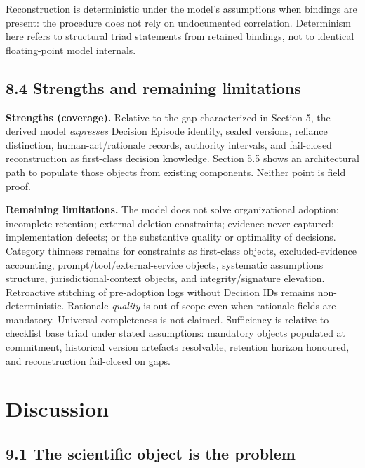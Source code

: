 \documentclass[11pt,a4paper]{article}
\begin{document}
Reconstruction is deterministic under the model's assumptions when bindings are present: the procedure does not rely on undocumented correlation. Determinism here refers to structural triad statements from retained bindings, not to identical floating-point model internals.


\subsection{8.4 Strengths and remaining limitations}

\textbf{Strengths (coverage).} Relative to the gap characterized in Section 5, the derived model \emph{expresses} Decision Episode identity, sealed versions, reliance distinction, human-act/rationale records, authority intervals, and fail-closed reconstruction as first-class decision knowledge. Section 5.5 shows an architectural path to populate those objects from existing components. Neither point is field proof.


\textbf{Remaining limitations.} The model does not solve organizational adoption; incomplete retention; external deletion constraints; evidence never captured; implementation defects; or the substantive quality or optimality of decisions. Category thinness remains for constraints as first-class objects, excluded-evidence accounting, prompt/tool/external-service objects, systematic assumptions structure, jurisdictional-context objects, and integrity/signature elevation. Retroactive stitching of pre-adoption logs without Decision IDs remains non-deterministic. Rationale \emph{quality} is out of scope even when rationale fields are mandatory. Universal completeness is not claimed. Sufficiency is relative to checklist base triad under stated assumptions: mandatory objects populated at commitment, historical version artefacts resolvable, retention horizon honoured, and reconstruction fail-closed on gaps.



\section{Discussion}

\subsection{9.1 The scientific object is the problem}
\end{document}
